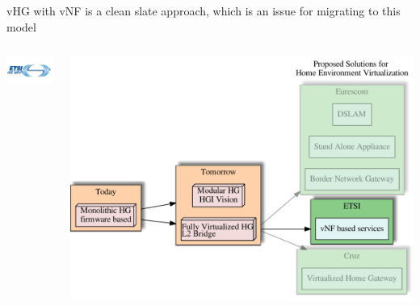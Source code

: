 \documentclass[a4paper]{beamer}
\begin{document}
\begin{frame}{vHG with vNF is a clean slate approach, which is an issue for migrating to this model}
		\begin{columns}[T]
		\begin{column}[T]{0.33 \textwidth} 
									\vspace{6em}
			\includegraphics[width=10em]{etsinfv.png}
		\end{column}
						
		\begin{column}[T]{0.66\textwidth} 
				   
				\includegraphics[width=\textwidth]{vhgtrends-etsi-emphasis.pdf}
																																
		\end{column}
																						
	\end{columns}
\end{frame}





\end{document}

